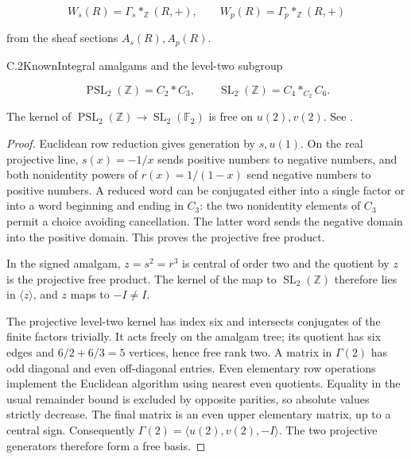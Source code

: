 $$
W_s(R)=\Gamma_s*_{\mathbb Z}(R,+),\qquad
 W_p(R)=\Gamma_p*_{\mathbb Z}(R,+)
$$

from the sheaf sections $A_s(R),A_p(R)$.

\begin{statement}{C.2}{Known}{Integral amalgams and the level-two subgroup}

$$
\operatorname{PSL}_2(\mathbb Z)=C_2*C_3,\qquad
 \operatorname{SL}_2(\mathbb Z)=C_4*_{C_2}C_6.
$$

The kernel of
$\operatorname{PSL}_2(\mathbb Z)\to\operatorname{SL}_2(\mathbb F_2)$
is free on $u(2),v(2)$.
See \citet[Theorems 1.1,3.1,C.1]{C_ConradSL2Z}.
\end{statement}
\begin{proof}
Euclidean row reduction gives generation by $s,u(1)$.
On the real projective line, $s(x)=-1/x$ sends positive numbers
to negative numbers, and both nonidentity powers of
$r(x)=1/(1-x)$ send negative numbers to positive numbers.
A reduced word can be conjugated either into a single factor
or into a word beginning and ending in $C_3$: the two nonidentity
elements of $C_3$ permit a choice avoiding cancellation.
The latter word sends the negative domain into the positive
domain. This proves the projective free product.

In the signed amalgam, $z=s^2=r^3$ is central of order two and
the quotient by $z$ is the projective free product.
The kernel of the map to $\operatorname{SL}_2(\mathbb Z)$
therefore lies in $\langle z\rangle$, and $z$ maps to $-I\ne I$.

The projective level-two kernel has index six and intersects
conjugates of the finite factors trivially. It acts freely on
the amalgam tree; its quotient has six edges and
$6/2+6/3=5$ vertices, hence free rank two.
A matrix in $\Gamma(2)$ has odd diagonal and even off-diagonal
entries. Even elementary row operations implement the Euclidean
algorithm using nearest even quotients. Equality in the usual
remainder bound is excluded by opposite parities, so absolute
values strictly decrease. The final matrix is an even upper
elementary matrix, up to a central sign. Consequently
$\Gamma(2)=\langle u(2),v(2),-I\rangle$.
The two projective generators therefore form a free basis.
\end{proof}

